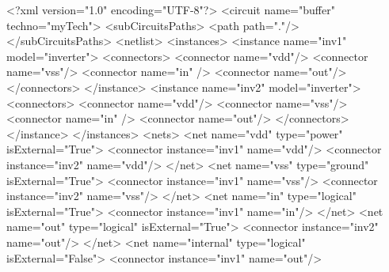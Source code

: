 \begin{DoxyCodeInclude}
<?xml version=\textcolor{stringliteral}{"1.0"} encoding=\textcolor{stringliteral}{"UTF-8"}?>
<circuit name=\textcolor{stringliteral}{"buffer"} techno=\textcolor{stringliteral}{"myTech"}>
  <subCircuitsPaths>
    <path   path=\textcolor{stringliteral}{"."}/>
  </subCircuitsPaths>
  <netlist>
    <instances>
      <instance name=\textcolor{stringliteral}{"inv1"} model=\textcolor{stringliteral}{"inverter"}>
        <connectors>
          <connector name=\textcolor{stringliteral}{"vdd"}/>
          <connector name=\textcolor{stringliteral}{"vss"}/>
          <connector name=\textcolor{stringliteral}{"in"} />
          <connector name=\textcolor{stringliteral}{"out"}/>
        </connectors>
      </instance>
      <instance name=\textcolor{stringliteral}{"inv2"} model=\textcolor{stringliteral}{"inverter"}>
        <connectors>
          <connector name=\textcolor{stringliteral}{"vdd"}/>
          <connector name=\textcolor{stringliteral}{"vss"}/>
          <connector name=\textcolor{stringliteral}{"in"} />
          <connector name=\textcolor{stringliteral}{"out"}/>
        </connectors>
      </instance>
    </instances>
    <nets>
      <net name=\textcolor{stringliteral}{"vdd"} type=\textcolor{stringliteral}{"power"} isExternal=\textcolor{stringliteral}{"True"}>
        <connector instance=\textcolor{stringliteral}{"inv1"} name=\textcolor{stringliteral}{"vdd"}/>
        <connector instance=\textcolor{stringliteral}{"inv2"} name=\textcolor{stringliteral}{"vdd"}/>
      </net>
      <net name=\textcolor{stringliteral}{"vss"} type=\textcolor{stringliteral}{"ground"} isExternal=\textcolor{stringliteral}{"True"}>
        <connector instance=\textcolor{stringliteral}{"inv1"} name=\textcolor{stringliteral}{"vss"}/>
        <connector instance=\textcolor{stringliteral}{"inv2"} name=\textcolor{stringliteral}{"vss"}/>
      </net>
      <net name=\textcolor{stringliteral}{"in"} type=\textcolor{stringliteral}{"logical"} isExternal=\textcolor{stringliteral}{"True"}>
        <connector instance=\textcolor{stringliteral}{"inv1"} name=\textcolor{stringliteral}{"in"}/>
      </net>
      <net name=\textcolor{stringliteral}{"out"} type=\textcolor{stringliteral}{"logical"} isExternal=\textcolor{stringliteral}{"True"}>
        <connector instance=\textcolor{stringliteral}{"inv2"} name=\textcolor{stringliteral}{"out"}/>
      </net>
      <net name=\textcolor{stringliteral}{"internal"} type=\textcolor{stringliteral}{"logical"} isExternal=\textcolor{stringliteral}{"False"}>
        <connector instance=\textcolor{stringliteral}{"inv1"} name=\textcolor{stringliteral}{"out"}/>

\end{DoxyCodeInclude}

